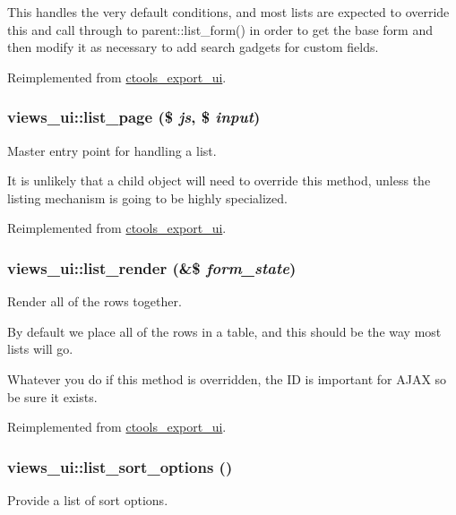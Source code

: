 This handles the very default conditions, and most lists are expected to override this and call through to parent::list\_\-form() in order to get the base form and then modify it as necessary to add search gadgets for custom fields. 

Reimplemented from \hyperlink{classctools__export__ui_a238e12ec5bfd7325bebad4f6261b6fa5}{ctools\_\-export\_\-ui}.\hypertarget{classviews__ui_a4f606da1d97a8f4cfa6c42bdad0ccaa1}{
\subsubsection[{list\_\-page}]{\setlength{\rightskip}{0pt plus 5cm}views\_\-ui::list\_\-page (\$ {\em js}, \/  \$ {\em input})}}
\label{classviews__ui_a4f606da1d97a8f4cfa6c42bdad0ccaa1}
Master entry point for handling a list.

It is unlikely that a child object will need to override this method, unless the listing mechanism is going to be highly specialized. 

Reimplemented from \hyperlink{classctools__export__ui_af0783238d93c1d94fdd86cf9d2f24d21}{ctools\_\-export\_\-ui}.\hypertarget{classviews__ui_a51cb7760695677e83c5f9635a76c3211}{
\subsubsection[{list\_\-render}]{\setlength{\rightskip}{0pt plus 5cm}views\_\-ui::list\_\-render (\&\$ {\em form\_\-state})}}
\label{classviews__ui_a51cb7760695677e83c5f9635a76c3211}
Render all of the rows together.

By default we place all of the rows in a table, and this should be the way most lists will go.

Whatever you do if this method is overridden, the ID is important for AJAX so be sure it exists. 

Reimplemented from \hyperlink{classctools__export__ui_aa9f27b96c434495b0d56abf6cdc72346}{ctools\_\-export\_\-ui}.\hypertarget{classviews__ui_a5f6a2333d7d780bf6760ce94bfe5d943}{
\subsubsection[{list\_\-sort\_\-options}]{\setlength{\rightskip}{0pt plus 5cm}views\_\-ui::list\_\-sort\_\-options ()}}
\label{classviews__ui_a5f6a2333d7d780bf6760ce94bfe5d943}
Provide a list of sort options.

